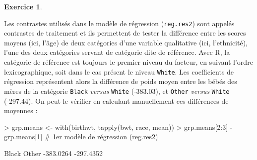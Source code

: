 \documentclass[11pt]{report}
\makeatletter
\theoremstyle{definition}
\newtheorem{exo}{Exercice}[chapter]
\newcommand{\foo}[1]{\texttt{#1}}
\newcommand{\cmd}[1]{\index{#1@\foo{#1}}}
\makeatother
\begin{document}
\begin{exo}
\begin{sol}
Les contrastes utilisés dans le modèle de régression (\texttt{reg.res2})
sont appelés contrastes de traitement et ils permettent de tester la
différence entre les scores moyens (ici, l'âge) de deux catégories d'une
variable qualitative (ici, l'ethnicité), l'une des deux catégories servant
de catégorie dite \og de référence\fg. Avec R, la catégorie de référence est
toujours le premier niveau du facteur, en suivant l'ordre lexicographique,
soit dans le cas présent le niveau \texttt{White}. Les coefficients de
régression représentent alors la différence de poids moyen entre les
bébés des mères de la catégorie \texttt{Black} \emph{versus} \texttt{White}
(-383.03), et \texttt{Other} \emph{versus} \texttt{White} (-297.44). On peut
le vérifier en calculant manuellement ces différences de moyennes :
\begin{Schunk}
\begin{Sinput}
> grp.means <- with(birthwt, tapply(bwt, race, mean))
> grp.means[2:3] - grp.means[1]     # 1er modèle de régression (reg.res2)
\end{Sinput}
\begin{Soutput}
    Black     Other 
-383.0264 -297.4352 
\end{Soutput}
\end{Schunk}


\end{sol}
\end{exo}
\end{document}
